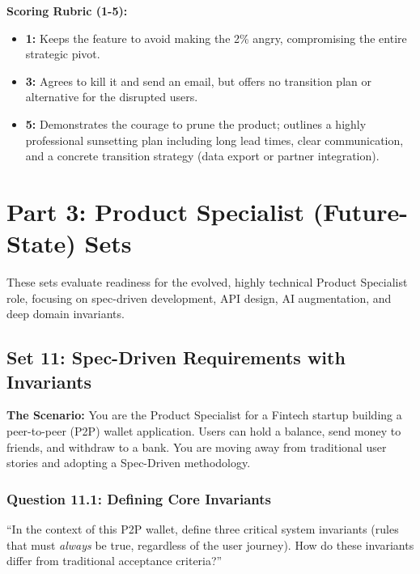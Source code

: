 \textbf{Scoring Rubric (1-5):}

\begin{itemize}
\tightlist
\item
  \textbf{1:} Keeps the feature to avoid making the 2\% angry,
  compromising the entire strategic pivot.
\item
  \textbf{3:} Agrees to kill it and send an email, but offers no
  transition plan or alternative for the disrupted users.
\item
  \textbf{5:} Demonstrates the courage to prune the product; outlines a
  highly professional sunsetting plan including long lead times, clear
  communication, and a concrete transition strategy (data export or
  partner integration).
\end{itemize}

\bigskip

\section{Part 3: Product Specialist (Future-State)
Sets}\label{part-3-product-specialist-future-state-sets}

These sets evaluate readiness for the evolved, highly technical Product
Specialist role, focusing on spec-driven development, API design, AI
augmentation, and deep domain invariants.

\subsection{Set 11: Spec-Driven Requirements with
Invariants}\label{set-11-spec-driven-requirements-with-invariants}

\textbf{The Scenario:} You are the Product Specialist for a Fintech
startup building a peer-to-peer (P2P) wallet application. Users can hold
a balance, send money to friends, and withdraw to a bank. You are moving
away from traditional user stories and adopting a Spec-Driven
methodology.

\subsubsection{Question 11.1: Defining Core
Invariants}\label{question-11.1-defining-core-invariants}

``In the context of this P2P wallet, define three critical system
invariants (rules that must \emph{always} be true, regardless of the
user journey). How do these invariants differ from traditional
acceptance criteria?''

